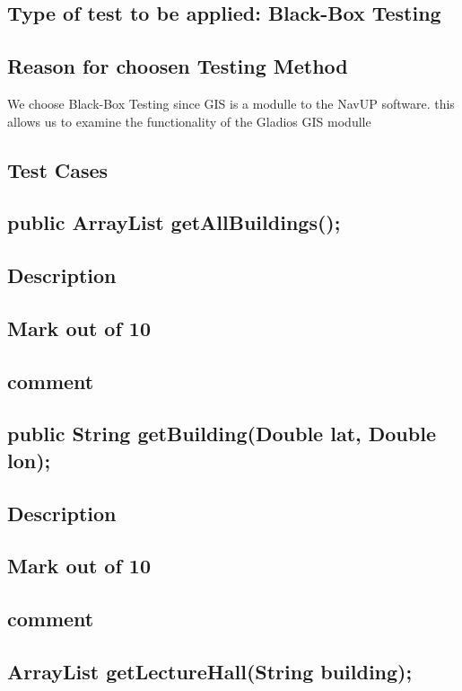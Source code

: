 \documentclass[12pt]{article}
\begin{document}
	\subsection{Type of test to be applied: Black-Box Testing}
		\subsection{Reason for choosen Testing Method }
		We choose Black-Box Testing since GIS is a modulle to the NavUP software. this allows us to examine the functionality of 
		the Gladios GIS modulle
	\subsection{Test Cases}
	 

		\subsection{public ArrayList getAllBuildings();   }    
			\subsection{Description}
			\subsection{Mark out of 10}     
			\subsection{comment}                                             
		\subsection{public String getBuilding(Double lat, Double lon);  } 
			\subsection{Description}
			\subsection{Mark out of 10}     
			\subsection{comment}                                                
		\subsection{ArrayList getLectureHall(String building); }           
\end{document}
